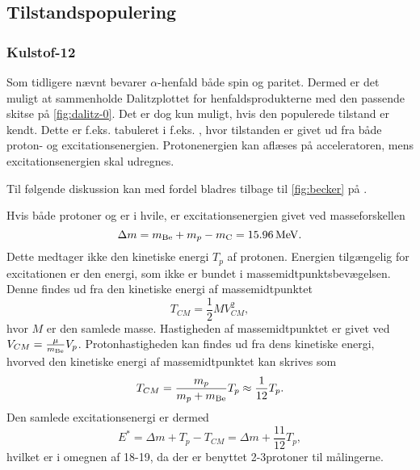 \subsection{Tilstandspopulering}
\label{sec:tilstand}

\subsubsection{Kulstof-12}
\label{sec:pop-carbon}

Som tidligere nævnt bevarer $\alpha$-henfald både spin og paritet. Dermed er det muligt at sammenholde
Dalitzplottet for henfaldsprodukterne med den passende skitse på \cref{fig:dalitz-0}. Det er dog kun
muligt, hvis den populerede \Carb tilstand er kendt. Dette er f.eks. tabuleret i f.eks. \cite{States}, hvor
tilstanden er givet ud fra både proton- og excitationsenergien. Protonenergien kan aflæses på
acceleratoren, mens excitationsenergien skal udregnes.

Til følgende diskussion kan med fordel bladres tilbage til \cref{fig:becker} på
.

Hvis både protoner og \Be er i hvile, er excitationsenergien givet ved masseforskellen
\begin{equation}
  \label{eq:massdiff}
  \Delta m = m_{\ce{Be}} + m_{p} - m_{\ce{C}} = \SI{15.96}{\MeV}. 
\end{equation}
Dette medtager ikke den kinetiske energi $T_{p}$ af protonen. Energien tilgængelig for
excitationen er den energi, som ikke er bundet i massemidtpunktsbevægelsen. Denne findes ud fra den
kinetiske energi af massemidtpunktet
\begin{equation}
  T_{CM} = \frac{1}{2}MV_{CM}^{2},
\end{equation}
hvor $M$ er den samlede masse. Hastigheden af massemidtpunktet er givet ved
$V_{CM} = \frac{\mu}{m_{\ce{Be}}} V_{p}$. Protonhastigheden kan findes ud fra dens kinetiske energi, hvorved den
kinetiske energi af massemidtpunktet kan skrives som
\begin{equation}
  \label{eq:Kcm}
  T_{CM} = \frac{m_{p}}{m_{p} + m_{\ce{Be}}} T_{p} \approx \frac{1}{12} T_{p}.
\end{equation}
Den samlede excitationsenergi er dermed
\begin{equation}
  \label{eq:excitation}
  E^{*} = \Delta m + T_{p} - T_{CM} = \Delta m + \frac{11}{12} T_{p},
\end{equation}
hvilket er i omegnen af 18-19\MeV, da der er benyttet 2-3\MeV protoner til målingerne.

